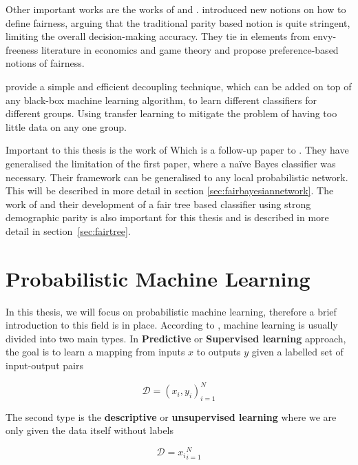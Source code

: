 Other important works are the works of \cite{Zafar:2017:NIPS} and \citet{Dwork:2018:PMLR}. \citet{Zafar:2017:NIPS} introduced new notions on how to define fairness, arguing that the traditional parity based notion is  quite stringent, limiting the overall decision-making accuracy. They tie in elements from envy-freeness literature in economics and game theory and propose preference-based notions of fairness. 

\citet{Dwork:2018:PMLR} provide a simple and efficient decoupling technique, which can be added on top of any black-box machine learning algorithm, to learn different classifiers for different groups. Using transfer learning to mitigate the problem of having too little data on any one group.

Important to this thesis is the work of \citet{Choi:2021:AIII} Which is a follow-up paper to \cite{Calders:20210:DMKD}. They have generalised the limitation of the first paper, where a naïve Bayes classifier was necessary. Their framework can be generalised to any local probabilistic network. This will be described in more detail in section \ref{sec:fairbayesiannetwork}. The work of \citet{Antonio:2021:arXiv} and their development of a fair tree based classifier using strong demographic parity is also important for this thesis and is described in more detail in section~\ref{sec:fairtree}.

\section{Probabilistic Machine Learning}
\label{sec:probmac}

In this thesis, we will focus on probabilistic machine learning, therefore a brief introduction to this field is in place. According to \citet{Murphy:2012:Book}, machine learning is usually divided into two main types. In \textbf{Predictive} or \textbf{Supervised learning} approach, the goal is to learn a mapping from inputs $x$ to outputs $y$ given a labelled set of input-output pairs \cite[p.~2]{Murphy:2012:Book}

\begin{equation*}
    \mathcal{D} = {(x_i, y_i)}_{i=1}^N
\end{equation*}

The second type is the \textbf{descriptive} or \textbf{unsupervised learning} where we are only given the data itself without labels

\begin{equation*}
    \mathcal{D} = {x_i}_{i=1}^N
\end{equation*}

